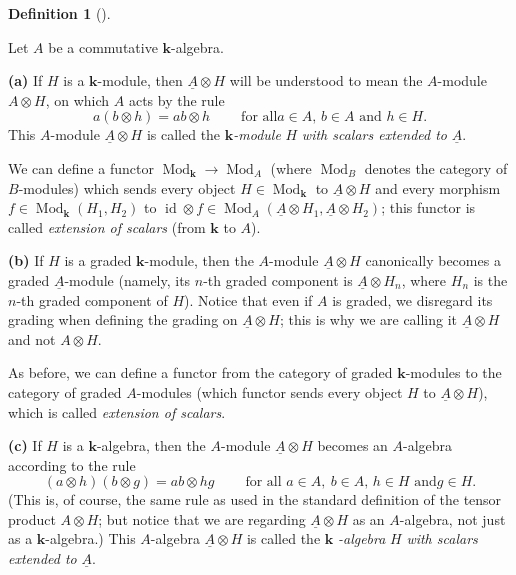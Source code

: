 \documentclass
[numbers=enddot,12pt,final,onecolumn,notitlepage,abstracton]{scrartcl}%
\theoremstyle{definition}
\newtheorem{defi}[theo]{Definition}
\newenvironment{definition}[1][]
{\begin{defi}[#1]\begin{leftbar}}
{\end{leftbar}\end{defi}}
\begin{document}
\begin{definition}
\label{def.extend-scalars}Let $A$ be a commutative $\mathbf{k}$-algebra.

\textbf{(a)} If $H$ is a $\mathbf{k}$-module, then $\underline{A}\otimes H$
will be understood to mean the $A$-module $A\otimes H$, on which $A$ acts by
the rule
\[
a\left(  b\otimes h\right)  =ab\otimes h\ \ \ \ \ \ \ \ \ \ \text{for all
}a\in A\text{, }b\in A\text{ and }h\in H.
\]
This $A$-module $\underline{A}\otimes H$ is called the $\mathbf{k}%
$\textit{-module }$H$\textit{ with scalars extended to }$\underline{A}$.

We can define a functor $\operatorname*{Mod}\nolimits_{\mathbf{k}}%
\rightarrow\operatorname*{Mod}\nolimits_{A}$ (where $\operatorname*{Mod}%
\nolimits_{B}$ denotes the category of $B$-modules) which sends every object
$H\in\operatorname*{Mod}\nolimits_{\mathbf{k}}$ to $\underline{A}\otimes H$
and every morphism $f\in\operatorname*{Mod}\nolimits_{\mathbf{k}}\left(
H_{1},H_{2}\right)  $ to $\operatorname*{id}\otimes f\in\operatorname*{Mod}%
\nolimits_{A}\left(  \underline{A}\otimes H_{1},\underline{A}\otimes
H_{2}\right)  $; this functor is called \textit{extension of scalars} (from
$\mathbf{k}$ to $A$).

\textbf{(b)} If $H$ is a graded $\mathbf{k}$-module, then the $A$-module
$\underline{A}\otimes H$ canonically becomes a graded $\underline{A}$-module
(namely, its $n$-th graded component is $\underline{A}\otimes H_{n}$, where
$H_{n}$ is the $n$-th graded component of $H$). Notice that even if $A$ is
graded, we disregard its grading when defining the grading on $\underline{A}%
\otimes H$; this is why we are calling it $\underline{A}\otimes H$ and not
$A\otimes H$.

As before, we can define a functor from the category of graded $\mathbf{k}%
$-modules to the category of graded $A$-modules (which functor sends every
object $H$ to $\underline{A}\otimes H$), which is called \textit{extension of
scalars}.

\textbf{(c)} If $H$ is a $\mathbf{k}$-algebra, then the $A$-module
$\underline{A}\otimes H$ becomes an $A$-algebra according to the rule%
\[
\left(  a\otimes h\right)  \left(  b\otimes g\right)  =ab\otimes
hg\ \ \ \ \ \ \ \ \ \ \text{for all }a\in A,\ b\in A\text{, }h\in H\text{ and
}g\in H.
\]
(This is, of course, the same rule as used in the standard definition of the
tensor product $A\otimes H$; but notice that we are regarding $\underline{A}%
\otimes H$ as an $A$-algebra, not just as a $\mathbf{k}$-algebra.) This
$A$-algebra $\underline{A}\otimes H$ is called the $\mathbf{k}$%
\textit{-algebra }$H$\textit{ with scalars extended to }$\underline{A}$.


\end{definition}
\end{document}
